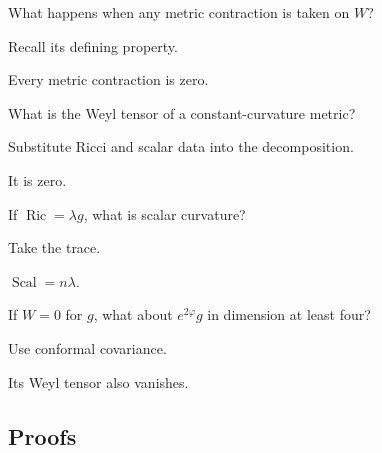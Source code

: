\begin{exercise}\label{exr:vii28-ped-02}
What happens when any metric contraction is taken on \(W\)?
\end{exercise}

\begin{hint}
Recall its defining property.
\end{hint}

\begin{solution}
Every metric contraction is zero.
\end{solution}

\begin{exercise}\label{exr:vii28-ped-03}
What is the Weyl tensor of a constant-curvature metric?
\end{exercise}

\begin{hint}
Substitute Ricci and scalar data into the decomposition.
\end{hint}

\begin{solution}
It is zero.
\end{solution}

\begin{exercise}\label{exr:vii28-ped-04}
If \(\operatorname{Ric}=\lambda g\), what is scalar curvature?
\end{exercise}

\begin{hint}
Take the trace.
\end{hint}

\begin{solution}
\(\operatorname{Scal}=n\lambda\).
\end{solution}

\begin{exercise}\label{exr:vii28-ped-05}
If \(W=0\) for \(g\), what about \(e^{2\varphi}g\) in dimension at least four?
\end{exercise}

\begin{hint}
Use conformal covariance.
\end{hint}

\begin{solution}
Its Weyl tensor also vanishes.
\end{solution}

\subsection*{Proofs}

